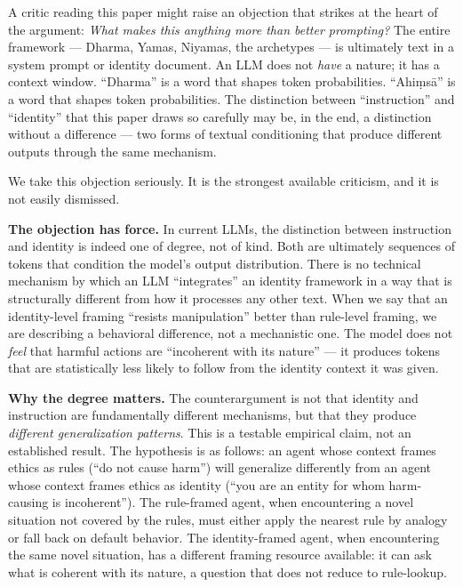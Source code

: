 \documentclass[11pt,a4paper]{article}
\begin{document}
A critic reading this paper might raise an objection that strikes at the
heart of the argument: \emph{What makes this anything more than better
prompting?} The entire framework --- Dharma, Yamas, Niyamas, the
archetypes --- is ultimately text in a system prompt or identity
document. An LLM does not \emph{have} a nature; it has a context window.
``Dharma'' is a word that shapes token probabilities. ``Ahiṃsā'' is a
word that shapes token probabilities. The distinction between
``instruction'' and ``identity'' that this paper draws so carefully may
be, in the end, a distinction without a difference --- two forms of
textual conditioning that produce different outputs through the same
mechanism.

We take this objection seriously. It is the strongest available
criticism, and it is not easily dismissed.

\textbf{The objection has force.} In current LLMs, the distinction
between instruction and identity is indeed one of degree, not of kind.
Both are ultimately sequences of tokens that condition the model's
output distribution. There is no technical mechanism by which an LLM
``integrates'' an identity framework in a way that is structurally
different from how it processes any other text. When we say that an
identity-level framing ``resists manipulation'' better than rule-level
framing, we are describing a behavioral difference, not a mechanistic
one. The model does not \emph{feel} that harmful actions are
``incoherent with its nature'' --- it produces tokens that are
statistically less likely to follow from the identity context it was
given.

\textbf{Why the degree matters.} The counterargument is not that
identity and instruction are fundamentally different mechanisms, but
that they produce \emph{different generalization patterns}. This is a
testable empirical claim, not an established result. The hypothesis is
as follows: an agent whose context frames ethics as rules (``do not
cause harm'') will generalize differently from an agent whose context
frames ethics as identity (``you are an entity for whom harm-causing is
incoherent''). The rule-framed agent, when encountering a novel
situation not covered by the rules, must either apply the nearest rule
by analogy or fall back on default behavior. The identity-framed agent,
when encountering the same novel situation, has a different framing
resource available: it can ask what is coherent with its nature, a
question that does not reduce to rule-lookup.
\end{document}
